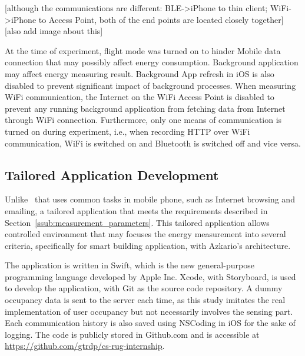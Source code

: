 \documentclass[journal]{vgtc}                %
\begin{document}
[although the communications are different: BLE->iPhone to thin client; WiFi->iPhone to Access Point, both of the end points are located closely together]
[also add image about this]

At the time of experiment, flight mode was turned on to hinder Mobile data connection that may possibly affect energy consumption.  Background application may affect energy measuring result. Background App refresh in iOS is also disabled to prevent significant impact of background processes. When measuring WiFi communication, the Internet on the WiFi Access Point is disabled to prevent any running background application from fetching data from Internet through WiFi connection. Furthermore, only one means of communication is turned on during experiment, i.e., when recording HTTP over WiFi communication, WiFi is switched on and Bluetooth is switched off and vice versa.


\subsection{Tailored Application Development} %
\label{sub:tailored_application_development}
Unlike~\cite{Balasubramanian2009} that uses common tasks in mobile phone, such as Internet browsing and emailing, a tailored application that meets the requirements described in Section~\ref{ssub:measurement_parameters}. This tailored application allows controlled environment that may focuses the energy measurement into several criteria, specifically for smart building application, with Azkario's architecture.

The application is written in Swift, which is the new general-purpose programming language developed by Apple Inc. Xcode, with Storyboard, is used to develop the application, with Git as the source code repository. A dummy occupancy data is sent to the server each time, as this study imitates the real implementation of user occupancy but not necessarily involves the sensing part. Each communication history is also saved using NSCoding in iOS for the sake of logging. The code is publicly stored in Github.com and is accessible at \url{https://github.com/gtrdp/cs-rug-internship}.
\end{document}
